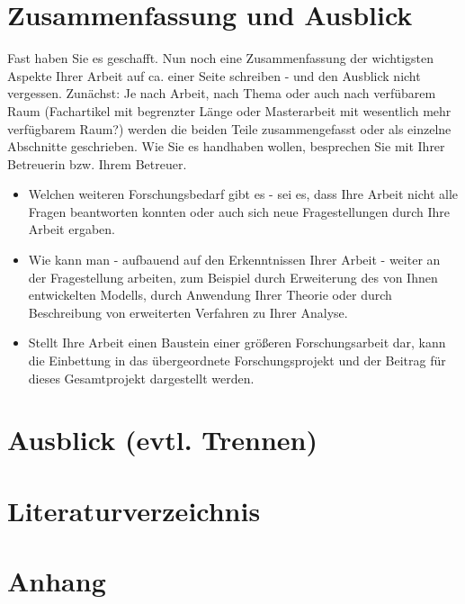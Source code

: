 \documentclass{article}
\begin{document}
\section{Zusammenfassung und Ausblick}

Fast haben Sie es geschafft. Nun noch eine Zusammenfassung der wichtigsten Aspekte Ihrer Arbeit auf ca. einer Seite schreiben - und den Ausblick nicht vergessen. 
Zunächst: Je nach Arbeit, nach Thema oder auch nach verfübarem Raum (Fachartikel mit begrenzter Länge oder Masterarbeit mit wesentlich mehr verfügbarem Raum?) werden die beiden Teile zusammengefasst oder als einzelne Abschnitte geschrieben. Wie Sie es handhaben wollen, besprechen Sie mit Ihrer Betreuerin bzw. Ihrem Betreuer. 

\begin{itemize}
    \item Welchen weiteren Forschungsbedarf gibt es - sei es, dass Ihre Arbeit nicht alle Fragen beantworten konnten oder auch sich neue Fragestellungen durch Ihre Arbeit ergaben.
    \item Wie kann man - aufbauend auf den Erkenntnissen Ihrer Arbeit - weiter an der Fragestellung arbeiten, zum Beispiel durch Erweiterung des von Ihnen entwickelten Modells, durch Anwendung Ihrer Theorie oder durch Beschreibung von erweiterten Verfahren zu Ihrer Analyse.
    \item Stellt Ihre Arbeit einen Baustein einer größeren Forschungsarbeit dar, kann die Einbettung in das übergeordnete Forschungsprojekt und der Beitrag für dieses Gesamtprojekt dargestellt werden. 
\end{itemize}

\section{Ausblick (evtl. Trennen)}

\section{Literaturverzeichnis}

\section{Anhang}
\end{document}
